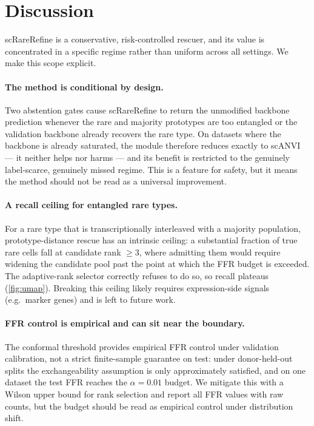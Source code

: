 \section{Discussion}
\label{sec:discussion}

scRareRefine is a conservative, risk-controlled rescuer, and its value is concentrated in a specific regime rather
than uniform across all settings. We make this scope explicit.

\paragraph{The method is conditional by design.} Two abstention gates cause scRareRefine to return the unmodified
backbone prediction whenever the rare and majority prototypes are too entangled or the validation backbone already
recovers the rare type. On datasets where the backbone is already saturated, the module therefore reduces exactly to
scANVI --- it neither helps nor harms --- and its benefit is restricted to the genuinely label-scarce, genuinely
missed regime. This is a feature for safety, but it means the method should not be read as a universal improvement.

\paragraph{A recall ceiling for entangled rare types.} For a rare type that is transcriptionally interleaved with a
majority population, prototype-distance rescue has an intrinsic ceiling: a substantial fraction of true rare cells
fall at candidate rank $\ge 3$, where admitting them would require widening the candidate pool past the point at
which the FFR budget is exceeded. The adaptive-rank selector correctly refuses to do so, so recall plateaus
(\cref{fig:umap}). Breaking this ceiling likely requires expression-side signals (e.g.\ marker genes) and is left to
future work.

\paragraph{FFR control is empirical and can sit near the boundary.} The conformal threshold provides empirical FFR
control under validation calibration, not a strict finite-sample guarantee on test: under donor-held-out splits the
exchangeability assumption is only approximately satisfied, and on one dataset the test FFR reaches the
$\alpha=0.01$ budget. We mitigate this with a Wilson upper bound for rank selection and report all FFR values with
raw counts, but the budget should be read as empirical control under distribution shift.

